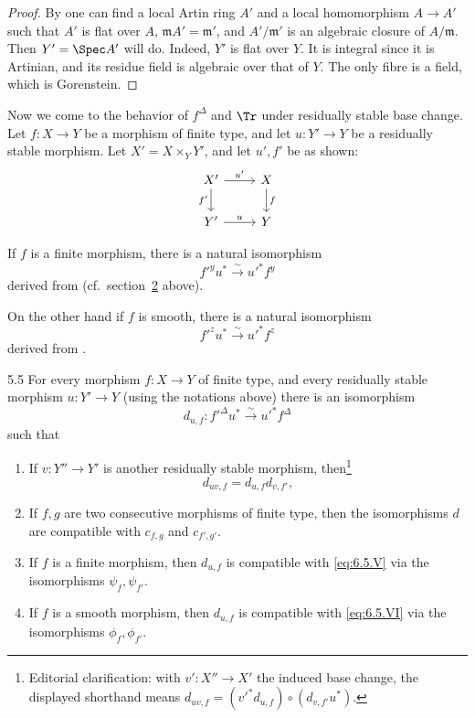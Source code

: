 \begin{proof}
By \cite[\nopp $0_{\mathrm{III}}$,~10.3.1]{EGA} one can find a local Artin ring $A'$ and a local homomorphism $A\to A'$ such that $A'$ is flat over $A$, $\mathfrak{m}A' = \mathfrak{m}'$, and $A'/\mathfrak{m}'$ is an algebraic closure of $A/\mathfrak{m}$. Then $Y' = \Spec A'$ will do. Indeed, $Y'$ is flat over $Y$. It is integral since it is Artinian, and its residue field is algebraic over that of $Y$. The only fibre is a field, which is Gorenstein.
\end{proof}

\par\endgroup

\begingroup
\setlength{\emergencystretch}{2em}
Now we come to the behavior of $f^{\Delta}$ and $\Tr$ under residually stable base change. Let $f\colon X\to Y$ be a morphism of finite type, and let $u\colon Y'\to Y$ be a residually stable morphism. Let $X' = X\times_{Y} Y'$, and let $u', f'$ be as shown:
\[
\begin{tikzcd}
X' \ar[r,"u'"] \ar[d,"f'"'] & X \ar[d,"f"] \\
Y' \ar[r,"u"] & Y
\end{tikzcd}
\]

If $f$ is a finite morphism, there is a natural isomorphism
\[
f'^{y}u^{*} \xrightarrow{\sim} u'^{*}f^{y} \tag{V}\label{eq:6.5.V}
\]
derived from  (cf.\ section~\hyperref[sec:6.2]{2} above).

On the other hand if $f$ is smooth, there is a natural isomorphism
\[
f'^{z}u^{*} \xrightarrow{\sim} u'^{*}f^{z} \tag{VI}\label{eq:6.5.VI}
\]
derived from .

\begin{booktheorem}{5.5}\label{thm:6.5.5}
For every morphism $f\colon X\to Y$ of finite type, and every residually stable morphism $u\colon Y'\to Y$ (using the notations above) there is an isomorphism
\[
d_{u,f}\colon f'^{\Delta}u^{*} \xrightarrow{\sim} u'^{*}f^{\Delta}
\]
such that
\begin{enumerate}
\item[1)] If $v\colon Y''\to Y'$ is another residually stable morphism, then\footnote{Editorial clarification: with $v'\colon X''\to X'$ the induced base change, the displayed shorthand means $d_{uv,f}=(v'^*d_{u,f})\circ(d_{v,f'}u^*)$.}
\[
d_{uv,f}=d_{u,f}d_{v,f'},
\]
\item[2)] If $f,g$ are two consecutive morphisms of finite type, then the isomorphisms $d$ are compatible with $c_{f,g}$ and $c_{f',g'}$.
\item[3)] If $f$ is a finite morphism, then $d_{u,f}$ is compatible with \eqref{eq:6.5.V} via the isomorphisms $\psi_f,\psi_{f'}$.
\item[4)] If $f$ is a smooth morphism, then $d_{u,f}$ is compatible with \eqref{eq:6.5.VI} via the isomorphisms $\phi_f,\phi_{f'}$.
\end{enumerate}
\end{booktheorem}


